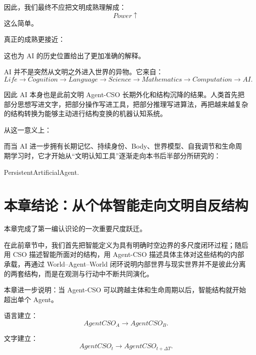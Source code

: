 因此，我们最终不应把文明成熟理解成：
\[
Power\uparrow
\]
这么简单。

真正的成熟更接近：
\begin{statementbox}
\centering
{}
\end{statementbox}

这也为 AI 的历史位置给出了更加准确的解释。

AI 并不是突然从文明之外进入世界的异物。它来自：
\[
Life
\rightarrow
Cognition
\rightarrow
Language
\rightarrow
Science
\rightarrow
Mathematics
\rightarrow
Computation
\rightarrow
AI.
\]

因此 AI 本身也是此前文明 Agent-CSO 长期外化和结构沉降的结果。人类首先把部分思想写进文字，把部分操作写进工具，把部分推理写进算法，再把越来越复杂的结构转换为能够主动进行结构变换的机器认知系统。

从这一意义上：
\begin{statementbox}
\centering
{}
\end{statementbox}

而当 AI 进一步拥有长期记忆、持续身份、Body、世界模型、自我调节和生命周期学习时，它才开始从“文明认知工具”逐渐走向本书后半部分所研究的：
\begin{statementbox}
PersistentArtificialAgent.
\end{statementbox}


\section{本章结论：从个体智能走向文明自反结构}

本章完成了第一编认识论的一次重要尺度跃迁。

在此前章节中，我们首先把智能定义为具有明确时空边界的多尺度闭环过程；随后用 CSO 描述智能所面对的结构，用 Agent-CSO 描述具体主体对这些结构的内部承载，再通过 World--Agent--World 闭环说明内部世界与现实世界并不是彼此分离的两套结构，而是在观测与行动中不断共同演化。

本章进一步说明：当 Agent-CSO 可以跨越主体和生命周期以后，智能结构就开始超出单个 Agent。

语言建立：
\[
AgentCSO_A
\rightarrow
AgentCSO_B.
\]

文字建立：
\[
AgentCSO_t
\rightarrow
AgentCSO_{t+\Delta T}.
\]

